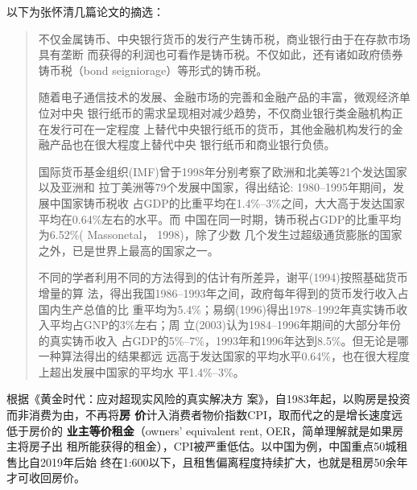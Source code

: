 以下为张怀清几篇论文的摘选：
\begin{quotation}
  不仅金属铸币、中央银行货币的发行产生铸币税，商业银行由于在存款市场具有垄断
  而获得的利润也可看作是铸币税。不仅如此，还有诸如政府债券铸币税（bond
  seigniorage）等形式的铸币税。

  随着电子通信技术的发展、金融市场的完善和金融产品的丰富，微观经济单位对中央
  银行纸币的需求呈现相对减少趋势，不仅商业银行类金融机构正在发行可在一定程度
  上替代中央银行纸币的货币，其他金融机构发行的金融产品也在很大程度上替代中央
  银行纸币和商业银行负债。

  国际货币基金组织(IMF)曾于1998年分别考察了欧洲和北美等21个发达国家以及亚洲和
  拉丁美洲等79个发展中国家，得出结论: 1980–1995年期间，发展中国家铸币税收
  占GDP的比重平均在1.4\%–3\%之间，大大高于发达国家平均在0.64\%左右的水平。而
  中国在同一时期，铸币税占GDP的比重平均为6.52\%( Massonetal， 1998)，除了少数
  几个发生过超级通货膨胀的国家之外，已是世界上最高的国家之一。

  不同的学者利用不同的方法得到的估计有所差异，谢平(1994)按照基础货币增量的算
  法，得出我国1986--1993年之间，政府每年得到的货币发行收入占国内生产总值的比
  重平均为5.4\%；易纲(1996)得出1978--1992年真实铸币收入平均占GNP的3\%左右；周
  立(2003)认为1984--1996年期间的大部分年份的真实铸币收入
  占GDP的5\%--7\%，1993年和1996年达到8.5\%。但无论是哪一种算法得出的结果都远
  远高于发达国家的平均水平0.64\%，也在很大程度上超出发展中国家的平均水
  平1.4\%--3\%。
\end{quotation}


根据《黄金时代：应对超现实风险的真实解决方
案》\cite{piepenburg2022gold}，自1983年起，以购房是投资而非消费为由，不再将\textbf{房
  价}计入消费者物价指数CPI，取而代之的是增长速度远低于房价的%
\textbf{业主等价租金}（owners’ equivalent rent, OER，简单理解就是如果房主将房子出
租所能获得的租金），CPI被严重低估。以中国为例，中国重点50城租售比自2019年后始
终在1:600以下，且租售偏离程度持续扩大，也就是租房50余年才可收回房价。


